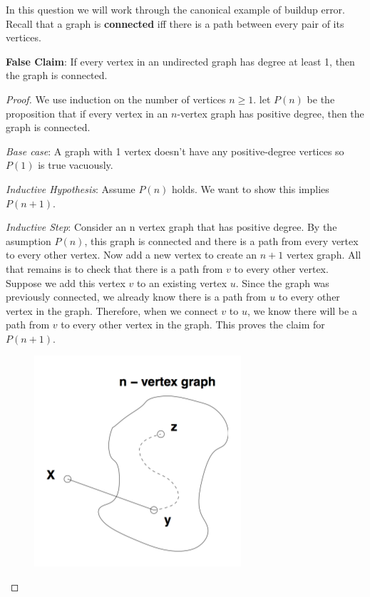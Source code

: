 In this question we will work through the canonical example of buildup error. Recall that a graph is \textbf{connected} iff there is a path between every pair of its vertices. \newline

\textbf{False Claim}: If every vertex in an undirected graph has degree 
at least 1, then the graph is connected.\newline

\begin{proof} We use induction on the number of vertices $n \geq 1$. let $P(n)$ be the proposition that if every vertex in an $n$-vertex graph has positive degree, then the graph is connected. \newline

\textit{Base case}: A graph with 1 vertex doesn't have any positive-degree vertices so $P(1)$ is true vacuously.\newline

\textit{Inductive Hypothesis}: Assume $P(n)$ holds. We want to show this implies $P(n+1)$.\newline

\textit{Inductive Step}: Consider an n vertex graph that has positive degree. By the asumption $P(n)$, this graph is connected and there is a path from every vertex to every other vertex. Now add a new vertex to create an $n+1$ vertex graph. All that remains is to check that there is a path from $v$ to every other vertex. Suppose we add this vertex $v$ to an existing vertex $u$. Since the graph was previously connected, we already know there is a path from $u$ to every other vertex in the graph. Therefore, when we connect $v$ to $u$, we know there will be a path from $v$ to every other vertex in the graph. This proves the claim for $P(n+1)$.

\begin{figure}[h]
\includegraphics{build_up_error}
\centering
\end{figure}
 
\end{proof}


